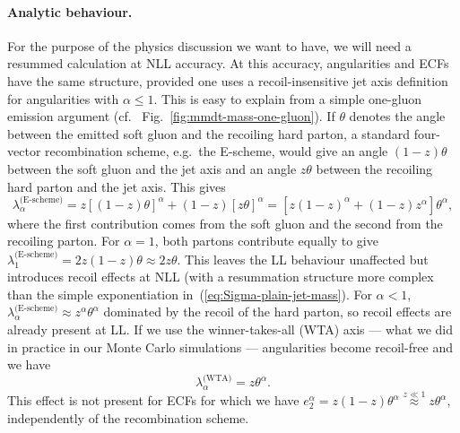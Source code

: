 \paragraph{Analytic behaviour.}
%
For the purpose of the physics discussion we want to have, we will
need a resummed calculation at NLL accuracy.
%
At this accuracy, angularities and ECFs have the same structure,
provided one uses a recoil-insensitive jet axis definition
for angularities with $\alpha\le 1$.
%
This is easy to explain from a simple one-gluon emission argument (cf.\ \eg
Fig.~\ref{fig:mmdt-mass-one-gluon}). If $\theta$ denotes the angle
between the emitted soft gluon and the recoiling hard parton, a
standard four-vector recombination scheme, e.g.\ the E-scheme, would give an angle
$(1-z)\theta$ between the soft gluon and the jet axis and an angle
$z\theta$ between the recoiling hard parton and the jet axis.  This
gives
%
\begin{equation}
\lambda_\alpha^\text{(E-scheme)}=z[(1-z)\theta]^\alpha + (1-z)[z\theta]^\alpha=[z(1-z)^\alpha+(1-z)z^\alpha]\theta^\alpha,
\end{equation}
where the first contribution comes from the soft gluon and the second
from the recoiling parton.
%
For $\alpha=1$, both partons contribute equally to give
$\lambda_1^\text{(E-scheme)}=2z(1-z)\theta\approx 2z\theta$. This
leaves the LL behaviour unaffected but introduces recoil effects at
NLL (with a resummation structure more complex than the simple
exponentiation in~(\ref{eq:Sigma-plain-jet-mass}).
%
For $\alpha<1$, $\lambda_\alpha^\text{(E-scheme)}
\approx z^\alpha\theta^\alpha$ dominated by the recoil of the hard
parton, so recoil effects are already present at LL.
%
If we use the winner-takes-all (WTA) axis --- what we did in
practice in our Monte Carlo simulations --- angularities become
recoil-free and we have
\begin{equation}
  \lambda_\alpha^\text{(WTA)}=z\theta^\alpha.
\end{equation}
%
This effect is not present for ECFs for which we have
$e_2^\alpha = z(1-z)\theta^\alpha\overset{z\ll
  1}{\approx}z\theta^\alpha$, independently of the recombination
scheme.

